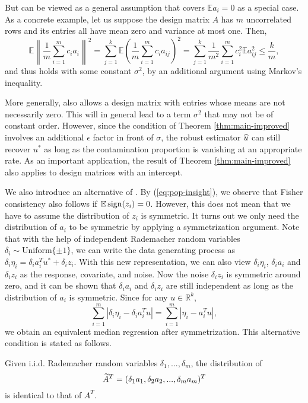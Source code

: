 But \conditionA{} can be viewed as a general assumption that covers $\mathbb{E}a_i=0$ as a special case. As a concrete example, let us suppose the design matrix $A$ has $m$ uncorrelated rows and its entries all have mean zero and variance at most one. Then,
$$\mathbb{E}\left\|\frac{1}{m}\sum_{i=1}^mc_ia_i\right\|^2=\sum_{j=1}^k\mathbb{E}\left(\frac{1}{m}\sum_{i=1}^mc_ia_{ij}\right)^2=\sum_{j=1}^k\frac{1}{m^2}\sum_{i=1}^mc_i^2\mathbb{E}a_{ij}^2\leq \frac{k}{m},$$
and thus \conditionA{} holds with some constant $\sigma^2$, by an additional argument using Markov's inequality.

More generally, \conditionA{} also allows a design matrix with entries whose means are not necessarily zero. This will in general lead to a term $\sigma^2$ that may not be of constant order. However, since the condition of Theorem \ref{thm:main-improved} involves an additional $\epsilon$ factor in front of $\sigma$, the robust estimator $\widehat{u}$ can still recover $u^*$ as long as the contamination proportion is vanishing at an appropriate rate. As an important application, the result of Theorem \ref{thm:main-improved} also applies to design matrices with an intercept.

We also introduce an alternative of \conditionA. By (\ref{eq:pop-insight}), we observe that Fisher consistency also follows if $\mathbb{E}\mathop{\rm sign}(z_i)=0$. However, this does not mean that we have to assume the distribution of $z_i$ is symmetric. It turns out we only need the distribution of $a_i$ to be symmetric by applying a symmetrization argument.
Note that with the help of independent Rademacher random variables $\delta_i\sim\text{Uniform}\{\pm 1\}$, we can write the data generating process as $\delta_i\eta_i=\delta_ia_i^Tu^*+\delta_iz_i$. With this new representation, we can also view $\delta_i\eta_i$, $\delta_ia_i$ and $\delta_iz_i$ as the response, covariate, and noise. Now the noise $\delta_iz_i$ is symmetric around zero, and it can be shown that $\delta_ia_i$ and $\delta_iz_i$ are still independent as long as the distribution of $a_i$ is symmetric. Since for any $u\in\mathbb{R}^k$,
$$\sum_{i=1}^m|\delta_i\eta_i- \delta_ia_i^Tu|=\sum_{i=1}^m|\eta_i-a_i^Tu|,$$
we obtain an equivalent median regression after symmetrization.
This alternative condition is stated as follows.


\begin{con1}
Given i.i.d. Rademacher random variables $\delta_1,...,\delta_m$, the distribution of
$$\widetilde{A}^T=(\delta_1a_1,\delta_2a_2,...,\delta_ma_m)^T$$
is identical to that of $A^T$.
\end{con1}

